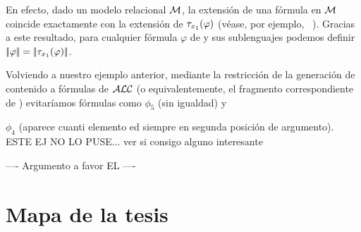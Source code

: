 En efecto, dado un modelo relacional $\mathcal{M}$, la extensi\'on de una f\'ormula \ALC en $\mathcal{M}$ coincide exactamente con la extensi\'on
 de $\mathit{\tau}_{x_1}(\varphi)$ (v\'ease, por ejemplo, ~\cite{baad:desc03}). Gracias
a este resultado, para cualquier f\'ormula $\varphi$ de \ALC y sus sublenguajes podemos definir 
$|\!|\varphi|\!| = |\!|\mathit{\tau}_{x_1}(\varphi)|\!|$.




 Volviendo a nuestro ejemplo anterior, mediante la restricci\'on de la generaci\'on de contenido
a f\'ormulas de $\mathcal{ALC}$ (o equivalentemente, el fragmento correspondiente de \FOL)
evitar\'iamos f\'ormulas como
$\phi_5$ (sin igualdad) y

$\phi_4$ (aparece cuanti elemento ed
siempre en segunda posici\'on de argumento). ESTE EJ NO LO PUSE... ver si consigo alguno interesante







----
Argumento a favor EL
----

\section{Mapa de la tesis}
\label{sec:mapadetesis}

